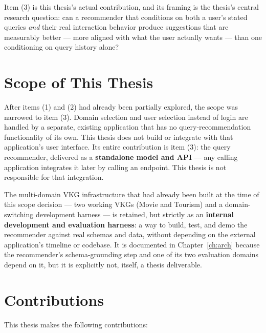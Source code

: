 Item (3) is this thesis's actual contribution, and its framing is the thesis's central research
question: can a recommender that conditions on both a user's stated queries \emph{and} their real
interaction behavior produce suggestions that are measurably better --- more aligned with what the
user actually wants --- than one conditioning on query history alone?

\section{Scope of This Thesis}
\label{sec:intro-scope}

After items (1) and (2) had already been partially explored, the scope was narrowed to item (3).
Domain selection and user selection instead of login are handled by a separate, existing
application that has no query-recommendation functionality of its own. This thesis does not build
or integrate with that application's user interface. Its entire contribution is item (3): the
query recommender, delivered as a \textbf{standalone model and API} --- any calling application
integrates it later by calling an endpoint. This thesis is not responsible for that integration.

The multi-domain VKG infrastructure that had already been built at the time of this scope decision
--- two working VKGs (Movie and Tourism) and a domain-switching development harness --- is retained,
but strictly as an \textbf{internal development and evaluation harness}: a way to build, test, and
demo the recommender against real schemas and data, without depending on the external
application's timeline or codebase. It is documented in Chapter~\ref{ch:arch} because the
recommender's schema-grounding step and one of its two evaluation domains depend on it, but it is
explicitly not, itself, a thesis deliverable.

\section{Contributions}
\label{sec:intro-contrib}

This thesis makes the following contributions:

